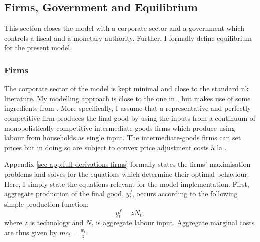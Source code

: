 \documentclass[12pt]{article} %
\numberwithin{equation}{section} %
\numberwithin{figure}{section}
\numberwithin{table}{section}
\begin{document}

\subsection{Firms, Government and Equilibrium}
\label{sec:model-sectors}

This section closes the model with a corporate sector and a government which controls a fiscal and a monetary authority. Further, I formally define equilibrium for the present model.

\subsubsection{Firms}
\label{sec:model-firms}

The corporate sector of the model is kept minimal and close to the standard \Gls{nk} literature. My modelling approach is close to the one in \textcite{mckay2016}, but makes use of some ingredients from \textcite{gust2017wp}. More specifically, I assume that a representative and perfectly competitive firm produces the final good by using the inputs from a continuum of monopolistically competitive intermediate-goods firms which produce using labour from households as single input. The intermediate-goods firms can set prices but in doing so are subject to convex price adjustment costs à la \textcite{rotemberg1982}. 

Appendix \ref{sec-app:full-derivations-firms} formally states the firms' maximisation problems and solves for the equations which determine their optimal behaviour. Here, I simply state the equations relevant for the model implementation. First, aggregate production of the final good, $y_t^f$, occurs according to the following simple production function:
\begin{equation}
    y_t^f = z N_t, \label{eq:firms-production}
\end{equation}
where $z$ is technology and $N_t$ is aggregate labour input. Aggregate marginal costs are thus given by $mc_t = \frac{w_t}{z}$. 
\end{document}
